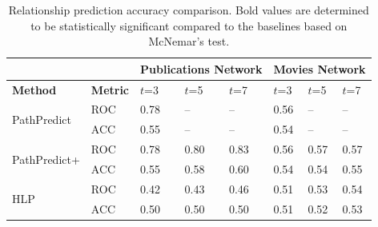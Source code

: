 

\begin{table}[t]\scriptsize
\centering
\caption{Relationship prediction accuracy comparison. Bold values are determined to be statistically significant compared to the baselines based on McNemar's test.}
\label{table_publications}\label{tbl:auc}
\begin{tabular}{ll|p{1cm}|p{1cm}|p{1cm}||p{1cm}|p{1cm}|p{1cm}|}
\cline{3-8}
                        &   & \multicolumn{3}{l||}{Publications Network} & \multicolumn{3}{l|}{Movies Network} \\ \hline
\multicolumn{1}{|l|}{\textbf{Method}} & \textbf{Metric} & $t$=3 & $t$=5  & $t$=7  & $t$=3  & $t$=5  & $t$=7     \\ \hline\hline

\multicolumn{1}{|l|}{\multirow{2}{*}{PathPredict}}  & ROC  & 0.78 & -- & -- & 0.56 & -- & -- \\ \cline{2-8}
\multicolumn{1}{|l|}{}  & ACC  & 0.55 & -- & -- & 0.54  & -- & -- \\ \hline\hline

\multicolumn{1}{|l|}{\multirow{2}{*}{PathPredict+}}  & ROC  &  0.78  &   0.80    &     0.83    &   0.56   &    0.57     &    0.57     \\ \cline{2-8}
\multicolumn{1}{|l|}{}  & ACC  & 0.55  & 0.58  &  0.60 & 0.54  &  0.54  & 0.55   \\ \hline\hline

\multicolumn{1}{|l|}{\multirow{2}{*}{HLP}}  & ROC  &   0.42  &   0.43   &   0.46     &     0.51    &    0.53     &    0.54     \\ \cline{2-8}
\multicolumn{1}{|l|}{}  & ACC  & 0.50  &  0.50  &  0.50 &  0.51  &  0.52  &  0.53  \\ \hline\hline


\end{tabular}
\end{table}
